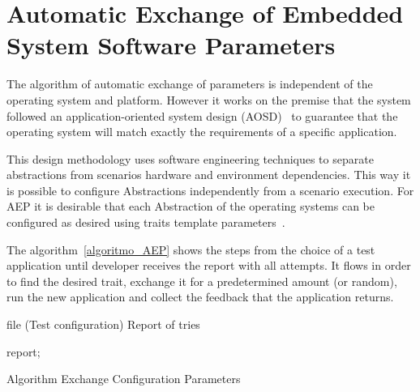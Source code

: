 \documentclass[conference]{IEEEtran}
\begin{document}
\section{Automatic Exchange of Embedded System Software Parameters}
The algorithm of automatic exchange of parameters is independent of the operating system and platform. However it works on the premise that the system followed an application-oriented system design (AOSD)~\cite{aods2005Guto} to guarantee that the operating system will match exactly the requirements of a specific application. 

This design methodology uses software engineering techniques to separate abstractions from scenarios hardware and environment dependencies. This way it is possible to configure Abstractions independently from a scenario execution. For AEP it is desirable that each Abstraction of the operating systems can be configured as desired using traits template parameters~\cite{Stroustrup:c++}. 

The algorithm~\ref{algoritmo_AEP} shows the steps from the choice of a test application  until developer receives the report with all attempts. It flows in order to find the desired trait, exchange it for a predetermined amount (or random), run the new application and collect the feedback that the application returns.

\begin{algorithm}
\small
\begin{algorithmic}
\REQUIRE file (Test configuration)
\ENSURE Report of tries

     \ENDFOR
   \ENDFOR
\ELSE
  \ELSE
  \ENDIF
  
  \ENDWHILE
\ENDIF
\RETURN report;

\end{algorithmic}
\caption{Algorithm Exchange Configuration Parameters}\label{algoritmo_AEP}
\end{algorithm}
\end{document}
